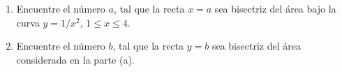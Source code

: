 \begin{enumerate}
    \item[(a)] Encuentre el número $a$, tal que la recta $x = a$ sea bisectriz del área bajo la curva $y = 1/x^2$, $1 \le x \le 4$.
    \item[(b)] Encuentre el número $b$, tal que la recta $y = b$ sea bisectriz del área considerada en la parte (a).
\end{enumerate}
